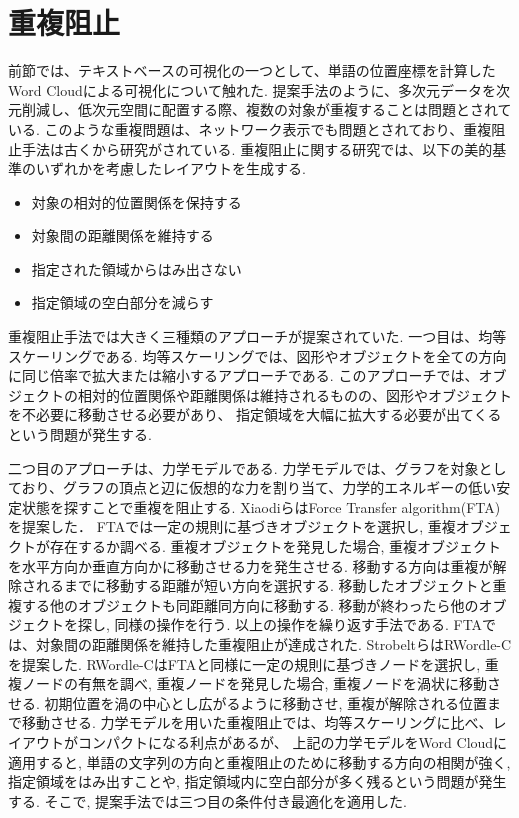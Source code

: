 \documentclass[syuuron]{kuee}
\begin{document}
	\section{重複阻止}
		前節では、テキストベースの可視化の一つとして、単語の位置座標を計算したWord Cloudによる可視化について触れた. 
		提案手法のように、多次元データを次元削減し、低次元空間に配置する際、複数の対象が重複することは問題とされている. 
		このような重複問題は、ネットワーク表示でも問題とされており、重複阻止手法は古くから研究がされている. 
		重複阻止に関する研究では、以下の美的基準のいずれかを考慮したレイアウトを生成する. 
		\begin{itemize}
			\item 対象の相対的位置関係を保持する
			\item 対象間の距離関係を維持する
			\item 指定された領域からはみ出さない
			\item 指定領域の空白部分を減らす
		\end{itemize}
		
		重複阻止手法では大きく三種類のアプローチが提案されていた. 
		一つ目は、均等スケーリングである. 均等スケーリングでは、図形やオブジェクトを全ての方向に同じ倍率で拡大または縮小するアプローチである\cite{fsa1}. 
		このアプローチでは、オブジェクトの相対的位置関係や距離関係は維持されるものの、図形やオブジェクトを不必要に移動させる必要があり、
		指定領域を大幅に拡大する必要が出てくるという問題が発生する. 
		
		二つ目のアプローチは、力学モデルである. 
		力学モデルでは、グラフを対象としており、グラフの頂点と辺に仮想的な力を割り当て、力学的エネルギーの低い安定状態を探すことで重複を阻止する. 
		XiaodiらはForce Transfer algorithm(FTA)を提案した\cite{fta1}．
		FTAでは一定の規則に基づきオブジェクトを選択し, 重複オブジェクトが存在するか調べる. 
		重複オブジェクトを発見した場合, 重複オブジェクトを水平方向か垂直方向かに移動させる力を発生させる. 
		移動する方向は重複が解除されるまでに移動する距離が短い方向を選択する. 移動したオブジェクトと重複する他のオブジェクトも同距離同方向に移動する. 
		移動が終わったら他のオブジェクトを探し, 同様の操作を行う. 以上の操作を繰り返す手法である. 
		FTAでは、対象間の距離関係を維持した重複阻止が達成された. 
		StrobeltらはRWordle-Cを提案した\cite{rwc1}. 
		RWordle-CはFTAと同様に一定の規則に基づきノードを選択し, 重複ノードの有無を調べ, 
		重複ノードを発見した場合, 重複ノードを渦状に移動させる. 初期位置を渦の中心とし広がるように移動させ, 重複が解除される位置まで移動させる. 
		力学モデルを用いた重複阻止では、均等スケーリングに比べ、レイアウトがコンパクトになる利点があるが、
		上記の力学モデルをWord Cloudに適用すると, 単語の文字列の方向と重複阻止のために移動する方向の相関が強く, 
		指定領域をはみ出すことや, 指定領域内に空白部分が多く残るという問題が発生する. 
		そこで, 提案手法では三つ目の条件付き最適化を適用した. 
		
\end{document}
